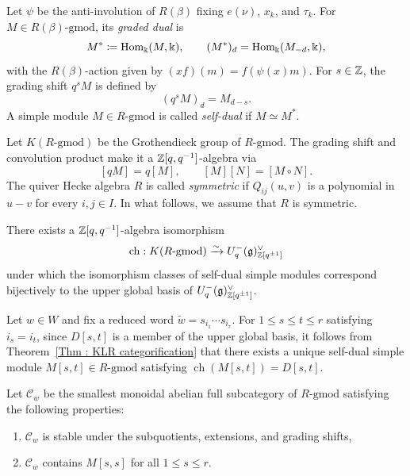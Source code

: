 Let $\psi$ be the anti-involution of $R(\beta)$
fixing $e(\nu)$, $x_k$, and $\tau_k$.
For $M \in R(\beta)\text{-}\mathrm{gmod}$, its \emph{graded dual} is
\[
M^* \coloneq \operatorname{Hom}_{\Bbbk}(M, \Bbbk), \qquad
(M^*)_d = \operatorname{Hom}_{\Bbbk}(M_{-d}, \Bbbk),
\]
with the $R(\beta)$-action given by $(xf)(m) = f(\psi(x)m)$.
For $s \in \mathbb{Z}$, the grading shift $q^s M$ is defined by
\[
(q^s M)_d = M_{d - s}.
\]
A simple module $M \in R\text{-}\mathrm{gmod}$
is called \emph{self-dual} if $M \simeq M^*$.

Let $K(R\text{-}\mathrm{gmod})$ be the Grothendieck group
of $R\text{-}\mathrm{gmod}$.
The grading shift and convolution product make it
a $\mathbb{Z}[q, q^{-1}]$-algebra via
\[
[qM] = q[M], \qquad [M][N] = [M \circ N].
\]
The quiver Hecke algebra $R$ is called \emph{symmetric}
if $Q_{ij}(u, v)$ is a polynomial in $u - v$ for every $i, j \in I$.
In what follows, we assume that $R$ is symmetric.

\begin{Thm}[{\cite{KL09, Ro08, VV11}}]
\label{Thm : KLR categorification}
There exists a $\mathbb{Z}[q, q^{-1}]$-algebra isomorphism
\[
\operatorname{ch} : K(R\text{-}\mathrm{gmod})
\xrightarrow{\sim} U_q^-(\mathfrak{g})_{\mathbb{Z}[q^{\pm 1}]}^\vee
\]
under which the isomorphism classes of self-dual simple modules
correspond bijectively to the upper global basis
of $U_q^-(\mathfrak{g})_{\mathbb{Z}[q^{\pm 1}]}^\vee$.
\end{Thm}

Let $w \in W$ and fix a reduced word
$\widetilde{w} = s_{i_1}\cdots s_{i_r}$.
For $1 \leq s \leq t \leq r$ satisfying $i_s = i_t$,
since $D[s, t]$ is a member of the upper global basis,
it follows from Theorem~\ref{Thm : KLR categorification}
that there exists a unique self-dual simple module
$M[s, t] \in R\text{-}\mathrm{gmod}$
satisfying $\operatorname{ch}(M[s, t]) = D[s, t]$.

\begin{Def}
\label{Def : Cw}
Let $\mathscr{C}_w$ be the smallest monoidal abelian full subcategory
of $R\text{-}\mathrm{gmod}$ satisfying the following properties:
\begin{enumerate}
    \item $\mathscr{C}_w$ is stable under the subquotients, extensions,
    and grading shifts,
    \item $\mathscr{C}_w$ contains $M[s, s]$ for all $1 \leq s \leq r$.
\end{enumerate}
\end{Def}

